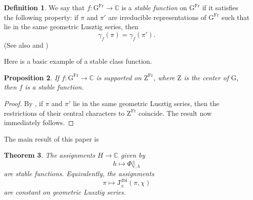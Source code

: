 \documentclass[12pt, reqno]{amsart}
\newtheorem{theorem}{Theorem}[section]
\newtheorem{proposition}[theorem]{Proposition}
\theoremstyle{definition}
\newtheorem{definition}[theorem]{Definition}
\theoremstyle{definition}
\theoremstyle{definition}
\newcommand{\cComplex}{\mathbb{C}}
\newcommand{\hermitianSpace}{\mathrm{V}}
\newcommand{\GL}{\mathrm{GL}}
\newcommand{\finiteField}{\mathbb{F}}
\newcommand{\Frobenius}{\operatorname{Fr}}
\newcommand{\genHermitianJacobiKernel}[2]{\Phi^{\pm}_{#1,#2}}
\newcommand{\dblJacobiSumScalar}[2]{\mathrm{J}_{\pm}^{\mathrm{dbl}}\left(#1, #2\right)}
\newcommand{\algebraicGroup}[1]{\boldsymbol{\mathrm{#1}}}
\begin{document}
\begin{definition}
	We say that  $f \colon \algebraicGroup{G}^{\Frobenius} \to \cComplex$ is a \emph{stable function} on $\algebraicGroup{G}^{\Frobenius}$ if it satisfies the following property: if $\pi$ and $\pi'$ are irreducible representations of $\algebraicGroup{G}^{\Frobenius}$ such that lie in the same geometric Lusztig series, then $$\gamma_{f}\left(\pi\right) = \gamma_{f}\left(\pi'\right).$$
(See also \cite[Section 4]{LaumonLetellier2023} and \cite[Section 4.1]{ChenBhattacharya2024})
	\end{definition}


Here is a basic example of a stable class function.
\begin{proposition}
\label{prop:central_char}
If $f \colon \algebraicGroup{G}^{\Frobenius} \to \cComplex$ is supported on $\algebraicGroup{Z}^{\Frobenius}$, where $\algebraicGroup{Z}$ is the center of $\algebraicGroup{G}$, then $f$ is a stable function.
\end{proposition}
\begin{proof}
By \cite[Lemma 2.2]{Malle2007}, if $\pi$ and $\pi'$ lie in the same geometric Lusztig series, then the restrictions of their central characters to $\algebraicGroup{Z}^{\Frobenius}$ coincide. The result now immediately follows.
\end{proof}
\begin{comment}
\begin{proof}
The Deligne Lusztig variety is a subset of the group, for any $z \in \algebraicGroup{Z}(\finiteField)$ we can move the action of $z \in algebraicGroup{G}(\finiteField)$ to the action of $z \in \algebraicGroup{T}(\finiteField)$
Thus it suffices to show that $\theta|_{\algebraicGroup{Z}(\finiteField))} = \theta'|_{\algebraicGroup{Z}(\finiteField)}$
But this follows from geometric conjugacy: for large enough $n$, $\theta \circ \fieldNorm{n}{1}|_{\algebraicGroup{Z}(\finiteField))} = \theta'\circ \fieldNorm{n}{1}|_{\algebraicGroup{Z}(\finiteField)}$
and the Norm map is surjective.
\end{proof}
\end{comment}


The main result of this paper is 
\begin{theorem}
\label{thm:Phi_stable}
	The assignments $H \to \cComplex$ given by $$h \mapsto \genHermitianJacobiKernel{\hermitianSpace}{h}$$ are stable functions. Equivalently, the assignments $$\pi \mapsto \dblJacobiSumScalar{\pi}{\chi}$$ are constant on geometric Lusztig series.
\end{theorem}
\end{document}
